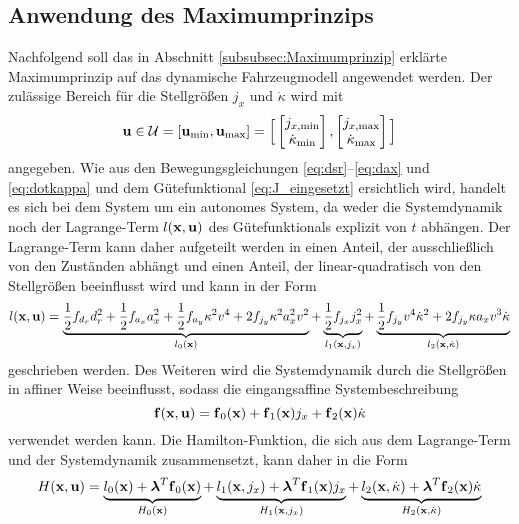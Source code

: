\subsection{Anwendung des Maximumprinzips}\label{subsec:Anwendung_Maximumprinzip}
Nachfolgend soll das in Abschnitt \ref{subsubsec:Maximumprinzip} erklärte Maximumprinzip auf das dynamische Fahrzeugmodell angewendet werden. Der zulässige Bereich für die Stellgrößen $j_x$ und $\dot{\kappa}$ wird mit 
\begin{equation}
	 \boldsymbol{\mathrm{u}}\in\mathcal{U}=[\boldsymbol{\mathrm{u}}_{\textrm{min}}, \boldsymbol{\mathrm{u}}_{\textrm{max}}] = \Big[\begin{bmatrix}
	 j_{x,\textrm{min}}\\
	 \dot{\kappa}_{\textrm{min}} 
	 \end{bmatrix},
	 \begin{bmatrix}
	 j_{x,\textrm{max}}\\
	 \dot{\kappa}_{\textrm{max}} 
	 \end{bmatrix}
	 \Big]
\end{equation}
angegeben. Wie aus den Bewegungsgleichungen \eqref{eq:dsr}--\eqref{eq:dax} und \eqref{eq:dotkappa} und dem Gütefunktional \eqref{eq:J_eingesetzt} ersichtlich wird, handelt es sich bei dem System um ein autonomes System, da weder die Systemdynamik noch der Lagrange-Term $l(\boldsymbol{\mathrm{x}},\boldsymbol{\mathrm{u}})$ des Gütefunktionals explizit von $t$ abhängen. Der Lagrange-Term kann daher aufgeteilt werden in einen Anteil, der ausschließlich von den Zuständen abhängt und einen Anteil, der linear-quadratisch von den Stellgrößen beeinflusst wird und kann in der Form
\begin{equation}
	l(\boldsymbol{\mathrm{x}},\boldsymbol{\mathrm{u}}) = \underbrace{\frac{1}{2}f_{d_r} d_r^2 + \frac{1}{2}f_{a_x} a_x^2 + \frac{1}{2}f_{a_y} \kappa^2v^4 + 2f_{j_y}\kappa^2a_x^2v^2}_{l_0(\boldsymbol{\mathrm{x}})} +\underbrace{\frac{1}{2}f_{j_x} j_x^2}_{l_1(\boldsymbol{\mathrm{x}},j_x)} + \underbrace{\frac{1}{2}f_{j_y} v^4\dot{\kappa}^2 + 2f_{j_y}\kappa a_xv^3\dot{\kappa}}_{l_2(\boldsymbol{\mathrm{x}},\dot{\kappa})} 
\end{equation}
geschrieben werden. Des Weiteren wird die Systemdynamik durch die Stellgrößen in affiner Weise beeinflusst, sodass die eingangsaffine Systembeschreibung
\begin{equation}
	\boldsymbol{\mathrm{f}}(\boldsymbol{\mathrm{x}},\boldsymbol{\mathrm{u}}) = \boldsymbol{\mathrm{f}}_0(\boldsymbol{\mathrm{x}})+\boldsymbol{\mathrm{f}}_1(\boldsymbol{\mathrm{x}})j_x+\boldsymbol{\mathrm{f}}_2(\boldsymbol{\mathrm{x}})\dot{\kappa}
\end{equation}
verwendet werden kann. Die Hamilton-Funktion, die sich aus dem Lagrange-Term und der Systemdynamik zusammensetzt, kann daher in die Form
\begin{equation}
	H(\boldsymbol{\mathrm{x}},\boldsymbol{\mathrm{u}}) = \underbrace{l_0(\boldsymbol{\mathrm{x}}) + \boldsymbol{\mathrm{\lambda}}^T\boldsymbol{\mathrm{f}}_0(\boldsymbol{\mathrm{x}})}_{H_0(\boldsymbol{\mathrm{x}})} +\underbrace{l_1(\boldsymbol{\mathrm{x}},j_x) + \boldsymbol{\mathrm{\lambda}}^T\boldsymbol{\mathrm{f}}_1(\boldsymbol{\mathrm{x}})j_x}_{H_1(\boldsymbol{\mathrm{x}},j_x)} + \underbrace{l_2(\boldsymbol{\mathrm{x}},\dot{\kappa}) +  \boldsymbol{\mathrm{\lambda}}^T\boldsymbol{\mathrm{f}}_2(\boldsymbol{\mathrm{x}})\dot{\kappa}}_{H_2(\boldsymbol{\mathrm{x}},\dot{\kappa})} \label{eq:Hamilton_Maximum_Prinzip}
\end{equation}
